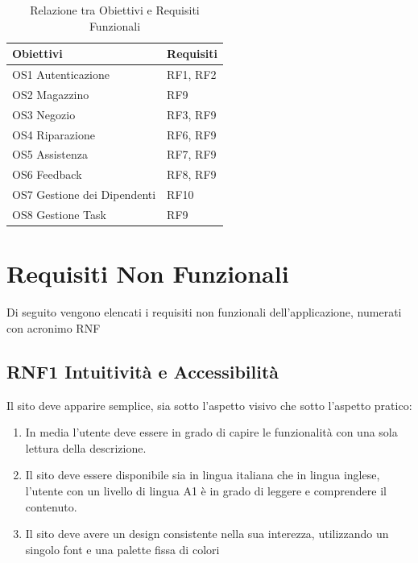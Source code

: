 \documentclass{report}
\begin{document}
\begin{table}[h]
\begin{center} %
	\centering
	\begin{tabular}{ |p{4cm}|p{4cm}|  }
		\hline
		\centering Obiettivi & \qquad\qquad Requisiti \\ %
		\hline
		OS1 Autenticazione & RF1, RF2 \\
		\hline
		OS2 Magazzino & RF9 \\
		\hline
		OS3 Negozio &
		RF3, RF9 \\
		\hline
		OS4 Riparazione & RF6, RF9\\
		\hline
		OS5 Assistenza & RF7, RF9 \\
		\hline
		OS6 Feedback & RF8, RF9 \\
		\hline
		OS7 Gestione dei Dipendenti & RF10 \\
		\hline
		OS8 Gestione Task & RF9 \\
		\hline
	\end{tabular}
\caption{Relazione tra Obiettivi e Requisiti Funzionali}
\end{center}
\end{table}


\section{Requisiti Non Funzionali}
Di seguito vengono elencati i requisiti non funzionali dell’applicazione, numerati con acronimo RNF

\subsection*{RNF1 Intuitività e Accessibilità}
Il sito deve apparire semplice, sia sotto l'aspetto visivo che sotto l'aspetto pratico:
\begin{enumerate}
	\item In media l’utente deve essere in grado di capire le funzionalità con una sola lettura della descrizione.
	\item Il sito deve essere disponibile sia in lingua italiana che in lingua inglese, l’utente con un livello di lingua A1 è in grado di leggere e comprendere il contenuto.
	\item Il sito deve avere un design consistente nella sua interezza, utilizzando un singolo font e una palette fissa di colori
\end{enumerate}
\end{document}
